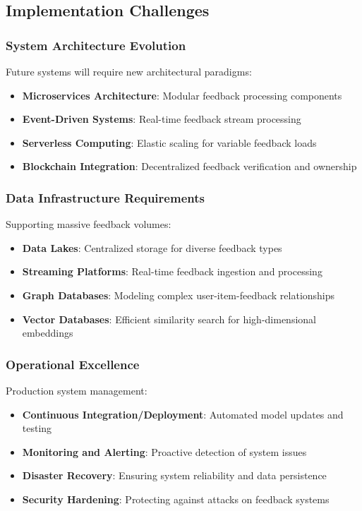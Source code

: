 \documentclass[acmsmall,review,anonymous]{acmart}
\begin{document}
\subsection{Implementation Challenges}

\subsubsection{System Architecture Evolution}

Future systems will require new architectural paradigms:

\begin{itemize}
    \item \textbf{Microservices Architecture}: Modular feedback processing components
    \item \textbf{Event-Driven Systems}: Real-time feedback stream processing
    \item \textbf{Serverless Computing}: Elastic scaling for variable feedback loads
    \item \textbf{Blockchain Integration}: Decentralized feedback verification and ownership
\end{itemize}

\subsubsection{Data Infrastructure Requirements}

Supporting massive feedback volumes:

\begin{itemize}
    \item \textbf{Data Lakes}: Centralized storage for diverse feedback types
    \item \textbf{Streaming Platforms}: Real-time feedback ingestion and processing
    \item \textbf{Graph Databases}: Modeling complex user-item-feedback relationships
    \item \textbf{Vector Databases}: Efficient similarity search for high-dimensional embeddings
\end{itemize}

\subsubsection{Operational Excellence}

Production system management:

\begin{itemize}
    \item \textbf{Continuous Integration/Deployment}: Automated model updates and testing
    \item \textbf{Monitoring and Alerting}: Proactive detection of system issues
    \item \textbf{Disaster Recovery}: Ensuring system reliability and data persistence
    \item \textbf{Security Hardening}: Protecting against attacks on feedback systems
\end{itemize}
\end{document}
